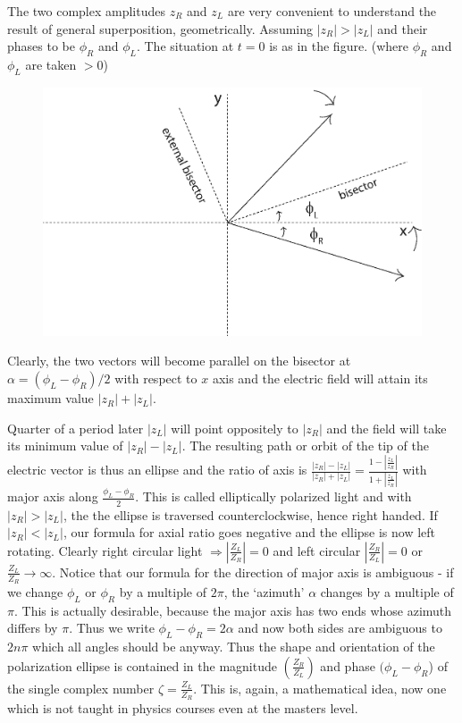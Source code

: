 The two complex amplitudes $z_R$ and $z_L$ are very convenient to understand
the result of general superposition, geometrically. Assuming $| z_R |>| z_L |$ and
their phases to be $\phi_R$ and $\phi_L$. The situation at $t = 0$ is as in the figure. (where $\phi_R$ and $\phi_L$ are taken $> 0$)
\medskip

\begin{figure}[H]
\centering
\includegraphics[scale=0.25]{src/images/chap26/3.jpg}
\end{figure}
\bigskip

Clearly, the two vectors will become parallel on the bisector at $\alpha = (\phi_L -\phi_R)/2$ 
with respect to $x$ axis and the electric field will attain its maximum value
$| z_R | + | z_L |$.

Quarter of a period later $| z_L |$ will point oppositely to $| z_R |$ and the field
will take its minimum value of $| z_R | - | z_L |$. The resulting path or orbit of the
tip of the electric vector is thus an ellipse and the ratio of axis is $\frac{|z_R| - |z_L|}{|z_R| + |z_L|} = \frac{1-|\frac{z_L}{z_R}|}{1+|\frac{z_L}{z_R}|}$
with major axis along $\frac{\phi_L -\phi_R}{2}$. This is called elliptically polarized light
and with $|z_R | > |z_L |$, the the ellipse is traversed counterclockwise, hence right
handed. If $|z_R | < |z_L |$, our formula for axial ratio goes negative and the ellipse
is now left rotating. Clearly right circular light $\Rightarrow |\frac{Z_L}{Z_R}| = 0$ and left circular $|\frac{Z_R}{Z_L}| =0$ or $\frac{Z_L}{Z_R} \to \infty$. 
 Notice that our formula for the direction of major axis is
ambiguous - if we change $\phi_L$ or $\phi_R$ by a multiple of $2\pi$, the `azimuth' $\alpha$ changes
by a multiple of $\pi$. This is actually desirable, because the major axis has two
ends whose azimuth differs by $\pi$. Thus we write $\phi_L - \phi_R = 2\alpha$ and now both
sides are ambiguous to $2n\pi$ which all angles should be anyway. Thus the shape
and orientation of the polarization ellipse is contained in the magnitude $\left(\frac{Z_R}{Z_L} \right)$
and phase $(\phi_L - \phi_R$) of the single complex number $\zeta = \frac{Z_L}{Z_R}$. This is, again, a
mathematical idea, now one which is not taught in physics courses even at the
masters level.


